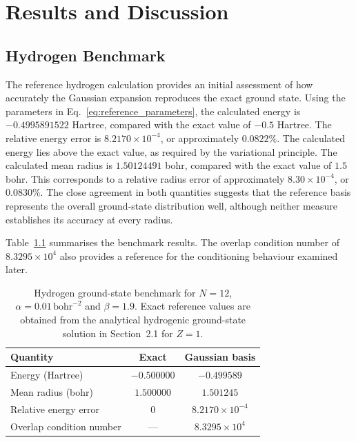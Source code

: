 
\chapter{Results and Discussion}
\label{chap:results}




\section{Hydrogen Benchmark}

The reference hydrogen calculation provides an initial assessment of how accurately the Gaussian
expansion reproduces the exact ground state. Using the parameters in Eq.~\eqref{eq:reference_parameters}, the calculated energy is $-0.4995891522$ Hartree, compared with
the exact value of $-0.5$ Hartree. The relative energy error is $8.2170\times10^{-4}$, or
approximately $0.0822\%$. The calculated energy lies above the exact value, as required by the
variational principle. The calculated mean radius is $1.50124491$ bohr, compared with the exact value of $1.5$ bohr. This corresponds to a relative radius error of approximately $8.30\times10^{-4}$, or $0.0830\%$. The
close agreement in both quantities suggests that the reference basis represents the overall
ground-state distribution well, although neither measure establishes its accuracy at every radius.

Table~\ref{tab:hydrogen_benchmark} summarises the benchmark results. The overlap condition number of
$8.3295\times10^4$ also provides a reference for the conditioning behaviour examined later.

\begin{table}[htbp]
\centering
\caption{Hydrogen ground-state benchmark for
$N=12$, $\alpha=0.01\,\mathrm{bohr}^{-2}$ and $\beta=1.9$.
Exact reference values are obtained from the analytical
hydrogenic ground-state solution in Section~2.1
for $Z=1$.}
\label{tab:hydrogen_benchmark}
\begin{tabular}{lcc}
\hline
Quantity & Exact & Gaussian basis\\
\hline
Energy (Hartree)
    & $-0.500000$ & $-0.499589$\\
Mean radius (bohr)
    & $1.500000$ & $1.501245$\\
Relative energy error
    & $0$ & $8.2170\times10^{-4}$\\
Overlap condition number
    & --- & $8.3295\times10^4$\\
\hline
\end{tabular}
\end{table}

